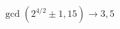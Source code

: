 \documentclass[preview]{standalone}
\begin{document}
\begin{align*}
\gcd(2^{4/2}\pm1, 15) \rightarrow 3, 5
\end{align*}
\end{document}
